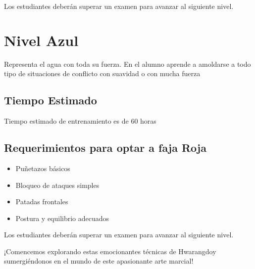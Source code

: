 Los estudiantes deberán superar un examen para avanzar al siguiente nivel.

\section{Nivel Azul}

Representa el agua con toda su fuerza. En el alumno aprende a amoldarse a todo tipo de situaciones de conflicto con suavidad o con mucha fuerza

\subsection[Duración]{Tiempo Estimado}

Tiempo estimado de entrenamiento es de 60 horas

\subsection{Requerimientos para optar a faja Roja}

\begin{itemize}
	\item Puñetazos básicos
	\item Bloqueo de ataques simples
	\item Patadas frontales
	\item Postura y equilibrio adecuados
\end{itemize}

Los estudiantes deberán superar un examen para avanzar al siguiente nivel.




¡Comencemos explorando estas emocionantes técnicas de Hwarangdo\textregistered y sumergiéndonos en el mundo de este apasionante arte marcial!